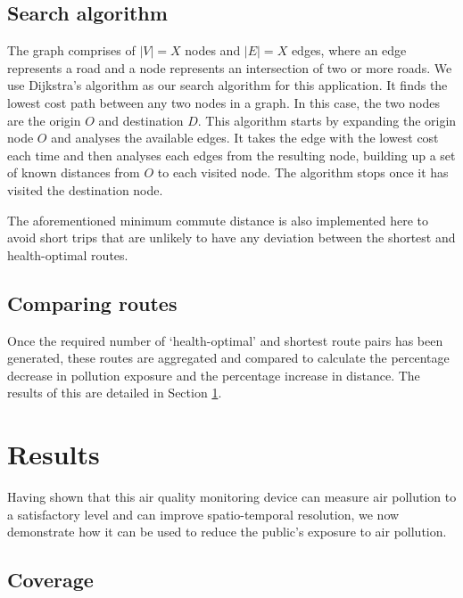 \documentclass[11pt,twosided,a4paper]{report}
\begin{document}
\subsection{Search algorithm}

The graph comprises of $|V| = X$ nodes and $|E| = X$ edges, where an edge represents a road and a node represents an intersection of two or more roads. We use Dijkstra's algorithm \citep{dijkstra1959} as our search algorithm for this application. It finds the lowest cost path between any two nodes in a graph. In this case, the two nodes are the origin $O$ and destination $D$. This algorithm starts by expanding the origin node $O$ and analyses the available edges. It takes the edge with the lowest cost each time and then analyses each edges from the resulting node, building up a set of known distances from $O$ to each visited node. The algorithm stops once it has visited the destination node.

The aforementioned minimum commute distance is also implemented here to avoid short trips that are unlikely to have any deviation between the shortest and health-optimal routes.


\subsection{Comparing routes}

Once the required number of `health-optimal' and shortest route pairs has been generated, these routes are aggregated and compared to calculate the percentage decrease in pollution exposure and the percentage increase in distance. The results of this are detailed in Section \ref{results:q3}.


\section{Results} \label{results:q3}

Having shown that this air quality monitoring device can measure air pollution to a satisfactory level and can improve spatio-temporal resolution, we now demonstrate how it can be used to reduce the public's exposure to air pollution.

\subsection{Coverage}
\end{document}
